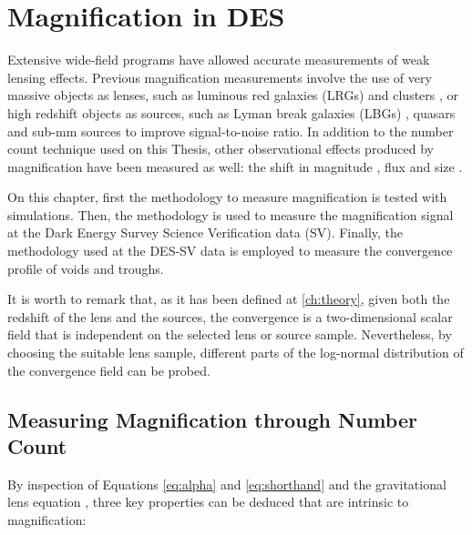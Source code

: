 \chapter{Magnification in DES}
\label{ch:magnification}

Extensive wide-field programs have allowed accurate measurements of weak lensing effects. Previous magnification measurements involve the use of very massive objects as lenses, such as luminous red galaxies (LRGs) and clusters \cite{1995AIPC..336..320B,2014MNRAS.440.3701B,2014MNRAS.439.3755F,2016MNRAS.457.3050C}, or high redshift objects as sources, such as Lyman break galaxies (LBGs) \cite{2009A&A...507..683H,2012MNRAS.426.2489M}, quasars \cite{1979ApJ...227...30S,1989Natur.339..106H,1990A&A...240...11F,1993A&A...268....1B,2002A&A...386..784M,0004-637X-633-2-589} and sub-mm sources  \cite{2011MNRAS.414..596W} to improve signal-to-noise ratio. In addition to the number count technique used on this Thesis, other observational effects produced by magnification have been measured as well: the shift in magnitude \cite{2010MNRAS.405.1025M}, flux \cite{2011MNRAS.411.2113J} and size \cite{2041-8205-780-2-L16}.
\newline

On this chapter, first the methodology to measure magnification is tested with simulations. Then, the methodology is used to measure the magnification signal at the Dark Energy Survey Science Verification data (SV). Finally, the methodology used at the DES-SV data is employed to measure the convergence profile of voids and troughs.
\newline

It is worth to remark that, as it has been defined at \autoref{ch:theory}, given both the redshift of the lens and the sources, the convergence is a two-dimensional scalar field that is independent on the selected lens or source sample. Nevertheless, by choosing the suitable lens sample, different parts of the log-normal distribution of the convergence field \cite{2017MNRAS.466.1444C} can be probed.

\section{Measuring Magnification through Number Count}
\label{sec:method}
By inspection of Equations \ref{eq:alpha} and \ref{eq:shorthand} and the gravitational lens equation \cite{1992ARA&A..30..311B}, three key properties can be deduced that are intrinsic to magnification:

